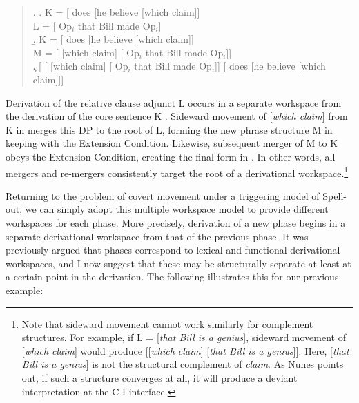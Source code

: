 \singlespacing
\begin{quote}
\ex.
\a. K = [ does [he believe [which claim]]\\
L = [ Op$_{i}$ that Bill made Op$_{i}$]\\
\b. K = [ does [he believe [which claim]]\\
M = [ [which claim] [ Op$_{i}$ that Bill made Op$_{i}$]]\\
\c. [ [ [which claim] [ Op$_{i}$ that Bill made Op$_{i}$]] [ does [he believe [which claim]]]


\end{quote}
\onehalfspacing
Derivation of the relative clause adjunct L occurs in a separate workspace from the derivation of the core sentence K \Last[a]. Sideward movement of [{\it which claim}] from K in \Last[b] merges this DP to the root of L, forming the new phrase structure M in keeping with the Extension Condition. Likewise, subsequent merger of M to K obeys the Extension Condition, creating the final form in \Last[c]. In other words, all mergers and re-mergers consistently target the root of a derivational workspace.\footnote{Note that sideward movement cannot work similarly for complement structures. For example, if L = [{\it that Bill is a genius}], sideward movement of [{\it which claim}] would produce [[{\it which claim}] [{\it that Bill is a genius}]]. Here, [{\it that Bill is a genius}] is not the structural complement of {\it claim}. As Nunes points out, if such a structure converges at all, it will produce a deviant interpretation at the C-I interface.}

Returning to the problem of covert movement under a triggering model of Spell-out, we can simply adopt this multiple workspace model to provide different workspaces for each phase. More precisely, derivation of a new phase begins in a separate derivational workspace from that of the previous phase. It was previously argued that phases correspond to lexical and functional derivational workspaces, and I now suggest that these may be structurally separate at least at a certain point in the derivation. The following illustrates this for our previous example:

